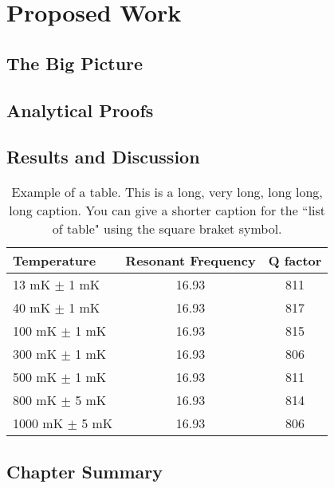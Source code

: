 \chapter{Proposed Work}
\label{chap:proposed.work}
\section{The Big Picture}
\section{Analytical Proofs}


\section{Results and Discussion}


\begin{table}[p]
	\centering
	\caption[Short version of the caption.]{Example of a table. This is a long, very long, long long, long caption.  You can give a shorter caption for the ``list of table" using the square braket symbol.}
	\vspace{\baselineskip}
	\begin{tabular}{l c c}
		\hline
		\hline
		Temperature & Resonant Frequency & Q factor\\
		\hline
		13 mK $\pm$ 1 mK & 16.93 & 811 \\
		40 mK $\pm$ 1 mK & 16.93 & 817 \\
		100 mK $\pm$ 1 mK & 16.93 & 815 \\
		300 mK $\pm$ 1 mK & 16.93 & 806\\
		500 mK $\pm$ 1 mK & 16.93 & 811\\
		800 mK $\pm$ 5 mK & 16.93 & 814\\
		1000 mK $\pm$ 5 mK & 16.93 & 806 \\
		\hline
		\hline
	\end{tabular}
\end{table}

\section{Chapter Summary}